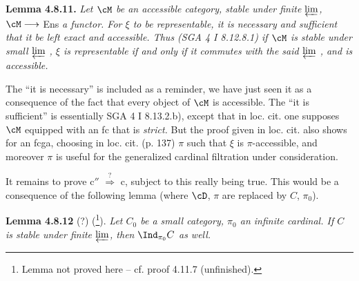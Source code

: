 \textbf{Lemma 4.8.11.} \textit{Let $\cM$ be an accessible category, stable under finite $\varprojlim$, $\cM \longrightarrow$} Ens \textit{a functor. For $\xi$ to be representable, it is necessary and sufficient that it be left exact and accessible. Thus (SGA 4 I 8.12.8.1) if $\cM$ is stable under small $\varprojlim$ , $\xi$ is representable if and only if it commutes with the said $\varprojlim$ , and is accessible.}




The ``it is necessary'' is included as a reminder, we have just seen it as a consequence of the fact that every object of $\cM$ is accessible. The ``it is sufficient'' is essentially SGA 4 I 8.13.2.b), except that in loc. cit. one supposes $\cM$ equipped with an fc that is \textit{strict.} But the proof given in loc. cit. also shows for an fcga, choosing in loc. cit. (p. 137) $\pi$ such that $\xi$ is $\pi$-accessible, and moreover $\pi$ is useful for the generalized cardinal filtration under consideration.

It remains to prove c$''$ $\overset{?}{\Longrightarrow}$ c, subject to this really being true. This would be a consequence of the following lemma (where $\cD$, $\pi$ are replaced by $C$, $\pi_0$).

\textbf{Lemma 4.8.12} (?) (\footnote[88]{Lemma not proved here -- cf. proof 4.11.7 (unfinished).}). \textit{Let $C_0$ be a small category, $\pi_0$ an infinite cardinal. If $C$ is stable under finite $\varprojlim$, then $\Ind_{\pi_0}C$ as well.} %

